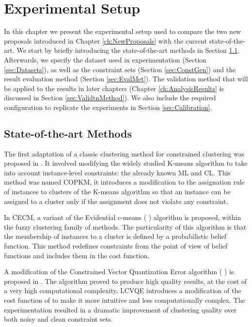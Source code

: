 \chapter{Experimental Setup} \label{ch:ExperimentalSetup}

In this chapter we present the experimental setup used to compare the two new proposals introduced in Chapter \ref{ch:NewProposals} with the current state-of-the-art. We start by briefly introducing the state-of-the-art methods in Section \ref{sec:SOTA}. Afterwards, we specify the dataset used in experimentation (Section \ref{sec:Datasets}), as well as the constraint sets (Section \ref{sec:ConstGen}) and the result evaluation method (Section \ref{sec:EvalMet}). The validation method that will be applied to the results in later chapters (Chapter \ref{ch:AnalysisResults} is discussed in Section \ref{sec:ValidtnMethod}). We also include the required configuration to replicate the experiments in Section \ref{sec:Calibration}.

\section{State-of-the-art Methods} \label{sec:SOTA}

The first adaptation of a classic clustering method for constrained clustering was proposed in \cite{wagstaff2001constrained}. It involved modifying the widely studied K-means algorithm to take into account instance-level constraints: the already known \acs{ML} and \acs{CL}. This method was named \acf{COPKM}, it introduces a modification to the assignation rule of instances to clusters of the K-means algorithm so that an instance can be assigned to a cluster only if the assignment does not violate any constraint.

In \cite{antoine2012cecm} \acf{CECM}, a variant of the Evidential c-means ( \cite{masson2008ecm}) algorithm is proposed, within the fuzzy clustering family of methods. The particularity of this algorithm is that the membership of instances to a cluster is defined by a probabilistic belief function. This method redefines constraints from the point of view of belief functions and includes them in the cost function.

A modification of the Constrained Vector Quantization Error algorithm ( \cite{davidson2005clustering}) is proposed in \cite{pelleg2007k}. The  algorithm proved to produce high quality results, at the cost of a very high computational complexity. \acf{LCVQE} introduces a modification of the cost function of  to make it more intuitive and less computationally complex. The experimentation resulted in a dramatic improvement of clustering quality over both noisy and clean constraint sets.

